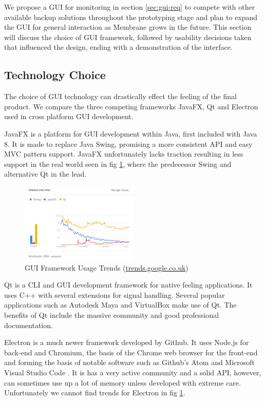 \documentclass[11pt, a4paper, twoside]{report}
\begin{document}
We propose a GUI for monitoring in section \ref{sec:gui-req} to compete with other available backup solutions throughout the prototyping stage and plan to expand the GUI for general interaction as Membrane grows in the future. This section will discuss the choice of GUI framework, followed by usability decisions taken that influenced the design, ending with a demonstration of the interface.

\subsection{Technology Choice} \label{sec:gui-technology-choice}

The choice of GUI technology can drastically effect the feeling of the final product. We compare the three competing frameworks JavaFX, Qt and Electron used in cross platform GUI development.

JavaFX is a platform for GUI development within Java, first included with Java 8. It is made to replace Java Swing, promising a more consistent API and easy MVC pattern support. JavaFX unfortunately lacks traction resulting in less support in the real world seen in fig \ref{fig:gui-trends}, where the predecessor Swing and alternative Qt in the lead.

\begin{figure}[h]
 \centering
 \includegraphics[width=0.5\textwidth]{gui-trends}
 \caption{GUI Framework Usage Trends (\url{trends.google.co.uk})}
 \label{fig:gui-trends}
\end{figure}

Qt is a CLI and GUI development framework for native feeling applications. It uses C++ with several extensions for signal handling. Several popular applications such as Autodesk Maya and VirtualBox \citep*{oracle2017logging, autodesk2017qt} make use of Qt. The benefits of Qt include the massive community and good professional documentation. \citep{slant2017qtelectron}

Electron is a much newer framework developed by Github. It uses Node.js for back-end and Chromium, the basis of the Chrome web browser for the front-end and forming the basis of notable software such as Github's Atom and Microsoft Visual Studio Code \citep{james2015vselectron}. It is has a very active community and a solid API, however, can sometimes use up a lot of memory unless developed with extreme care. Unfortunately we cannot find trends for Electron in fig \ref{fig:gui-trends}.
\end{document}
